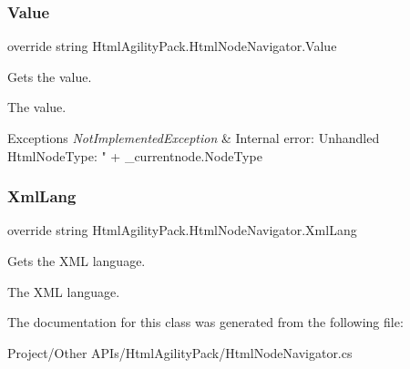 \subsubsection{\texorpdfstring{Value}{Value}}
{\footnotesize\ttfamily override string Html\+Agility\+Pack.\+Html\+Node\+Navigator.\+Value\hspace{0.3cm}{\ttfamily [get]}}



Gets the value. 

The value.


\begin{DoxyExceptions}{Exceptions}
{\em Not\+Implemented\+Exception} & Internal error\+: Unhandled Html\+Node\+Type\+: " + \+\_\+currentnode.\+Node\+Type\\
\hline
\end{DoxyExceptions}
\mbox{\label{class_html_agility_pack_1_1_html_node_navigator_ad6be697bf6a02cb6b44aa4d1b5611ebe}} 
\subsubsection{\texorpdfstring{Xml\+Lang}{XmlLang}}
{\footnotesize\ttfamily override string Html\+Agility\+Pack.\+Html\+Node\+Navigator.\+Xml\+Lang\hspace{0.3cm}{\ttfamily [get]}}



Gets the X\+ML language. 

The X\+ML language.

The documentation for this class was generated from the following file\+:\begin{DoxyCompactItemize}
\item 
Project/\+Other A\+P\+Is/\+Html\+Agility\+Pack/Html\+Node\+Navigator.\+cs\end{DoxyCompactItemize}
